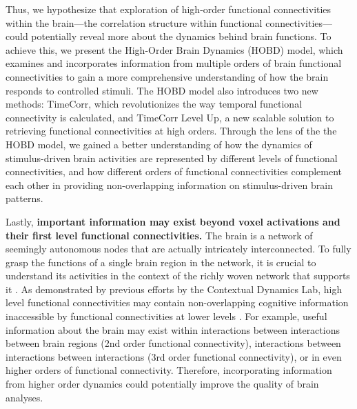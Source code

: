 \documentclass[11pt]{article}
\begin{document}
Thus, we hypothesize that exploration of high-order functional connectivities within the brain---the correlation structure within functional connectivities---could potentially reveal more about the dynamics behind brain functions. To achieve this, we present the High-Order Brain Dynamics (HOBD) model, which examines and incorporates information from multiple orders of brain functional connectivities to gain a more comprehensive understanding of how the brain responds to controlled stimuli. The HOBD model also introduces two new methods: TimeCorr, which revolutionizes the way temporal functional connectivity is calculated, and TimeCorr Level Up, a new scalable solution to retrieving functional connectivities at high orders. Through the lens of the the HOBD model, we gained a better understanding of how the dynamics of stimulus-driven brain activities are represented by different levels of functional connectivities, and how different orders of functional connectivities complement each other in providing non-overlapping information on stimulus-driven brain patterns.

Lastly, \textbf{important information may exist beyond voxel activations and their first level functional connectivities.} The brain is a network of seemingly autonomous nodes that are actually intricately interconnected. To fully grasp the functions of a single brain region in the network, it is crucial to understand its activities in the context of the richly woven network that supports it \citep{Battiston2017}. As demonstrated by previous efforts by the Contextual Dynamics Lab, high level functional connectivities may contain non-overlapping cognitive information inaccessible by functional connectivities at lower levels \citep{jeremy2017}. For example, useful information about the brain may exist within interactions between interactions between brain regions (2nd order functional connectivity), interactions between interactions between interactions (3rd order functional connectivity), or in even higher orders of functional connectivity. Therefore, incorporating information from higher order dynamics could potentially improve the quality of brain analyses.
\end{document}
